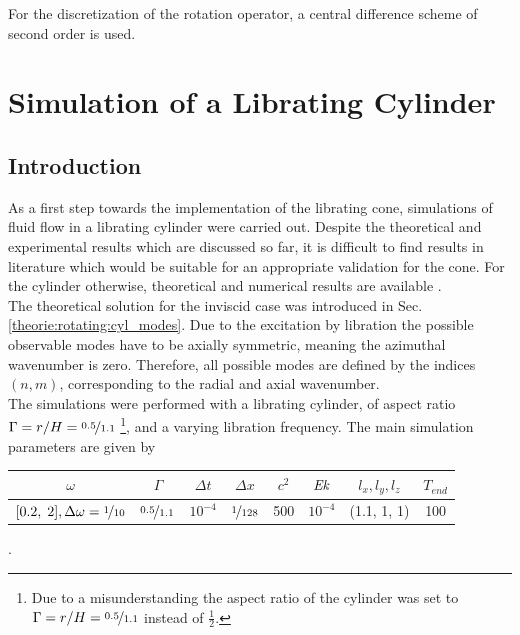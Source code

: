 For the discretization of the rotation operator, a central difference scheme of second order is used.
\clearpage



\section{Simulation of a Librating Cylinder}
\subsection{Introduction}
\label{cone:sec:lib_cylinder}

As a first step towards the implementation of the librating cone, simulations of fluid flow in a librating cylinder were carried out.
Despite the theoretical and experimental results which are discussed so far,
it is difficult to find results in literature which would be suitable for an appropriate validation for the cone.
For the cylinder otherwise, theoretical and numerical results are available \citep{Greenspan1990, Sauret2012}.\\
The theoretical solution for the inviscid case was introduced in Sec. \ref{theorie:rotating:cyl_modes}.
Due to the excitation by libration the possible observable modes have to be axially symmetric, meaning the azimuthal wavenumber is zero.
Therefore, all possible modes are defined by the indices $(n, m)$, corresponding to the radial and axial wavenumber.\\
The simulations were performed with a librating cylinder, of aspect ratio $\Gamma=r/H=\nicefrac{0.5}{1.1}$
\footnote{Due to a misunderstanding the aspect ratio of the cylinder was set to $\Gamma=r/H=\nicefrac{0.5}{1.1}$ instead of $\frac{1}{2}$.},
and a varying libration frequency.
The main simulation parameters are given by


\begin{center}
\vspace*{0.7ex}
\begin{tabular}{c|c|c|c|c|c|c|c }
 $\omega $ & $\Gamma$ & $\Delta t$ & $\Delta x$ & $c^2$ & $\mbox{\textit{Ek}}$  & $l_x, l_y, l_z$ & $T_{end}$\\
\hline
 $[0.2,\; 2], \Delta \omega = \nicefrac{1}{10}$ & $\nicefrac{0.5}{1.1}$ & $10^{-4}$ & $\nicefrac{1}{128}$ & 500 & $10^{-4}$  & (1.1, 1, 1) & 100\\
\end{tabular}.
\vspace*{0.7ex}
\end{center}

